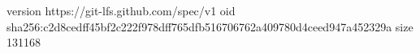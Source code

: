 version https://git-lfs.github.com/spec/v1
oid sha256:c2d8cedff45bf2c222f978dff765dfb516706762a409780d4ceed947a452329a
size 131168
